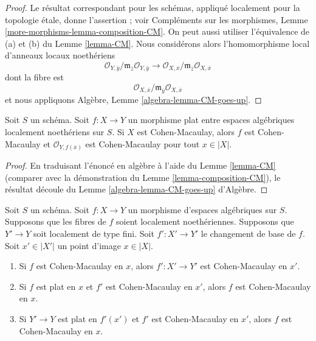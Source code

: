 \begin{proof}
Le résultat correspondant pour les schémas, appliqué localement pour la
topologie étale, donne l'assertion ; voir
Compléments sur les morphismes, Lemme \ref{more-morphisms-lemma-composition-CM}.
On peut aussi utiliser l'équivalence de (a) et (b) du
Lemme \ref{lemma-CM}. Nous considérons alors l'homomorphisme local
d'anneaux locaux noethériens
$$
\mathcal{O}_{Y, \overline{y}}/
\mathfrak m_{\overline{z}}\mathcal{O}_{Y, \overline{y}}
\longrightarrow
\mathcal{O}_{X, \overline{x}}/
\mathfrak m_{\overline{z}}\mathcal{O}_{X, \overline{x}}
$$
dont la fibre est
$$
\mathcal{O}_{X, \overline{x}}/
\mathfrak m_{\overline{y}}\mathcal{O}_{X, \overline{x}}
$$
et nous appliquons Algèbre, Lemme \ref{algebra-lemma-CM-goes-up}.
\end{proof}

\begin{lemma}
\label{lemma-flat-morphism-from-CM}
Soit $S$ un schéma.
Soit $f : X \to Y$ un morphisme plat entre espaces algébriques localement noethériens
sur $S$.
Si $X$ est Cohen-Macaulay, alors $f$ est Cohen-Macaulay et
$\mathcal{O}_{Y, f(\overline{x})}$ est Cohen-Macaulay pour tout $x \in |X|$.
\end{lemma}

\begin{proof}
En traduisant l'énoncé en algèbre à l'aide du Lemme \ref{lemma-CM}
(comparer avec la démonstration du
Lemme \ref{lemma-composition-CM}), le résultat découle du
Lemme \ref{algebra-lemma-CM-goes-up} d'Algèbre.
\end{proof}

\begin{lemma}
\label{lemma-base-change-CM}
Soit $S$ un schéma.
Soit $f : X \to Y$ un morphisme d'espaces algébriques sur $S$.
Supposons que les fibres de $f$ soient localement noethériennes.
Supposons que $Y' \to Y$ soit localement de type fini. Soit $f' : X' \to Y'$
le changement de base de $f$.
Soit $x' \in |X'|$ un point d'image $x \in |X|$.
\begin{enumerate}
\item Si $f$ est Cohen-Macaulay en $x$, alors
$f' : X' \to Y'$ est Cohen-Macaulay en $x'$.
\item Si $f$ est plat en $x$ et $f'$ est Cohen-Macaulay en $x'$, alors $f$
est Cohen-Macaulay en $x$.
\item Si $Y' \to Y$ est plat en $f'(x')$ et $f'$ est Cohen-Macaulay en
$x'$, alors $f$ est Cohen-Macaulay en $x$.
\end{enumerate}
\end{lemma}

